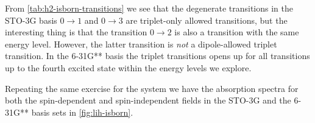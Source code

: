         From \autoref{tab:h2-isborn-transitions} we see that the degenerate
        transitions in the STO-3G basis $0 \to 1$ and $0 \to 3$ are triplet-only
        allowed transitions, but the interesting thing is that the transition $0
        \to 2$ is also a transition with the same energy level.
        However, the latter transition is \emph{not} a dipole-allowed triplet
        transition.
        In the 6-31G** basis the triplet transitions opens up for all
        transitions up to the fourth excited state within the energy levels we
        explore.


        Repeating the same exercise for the  system we have the
        absorption spectra for both the spin-dependent and spin-independent
        fields in the STO-3G and the 6-31G** basis sets in
        \autoref{fig:lih-isborn}.
        \begin{figure}
            \centering
\end{figure}
